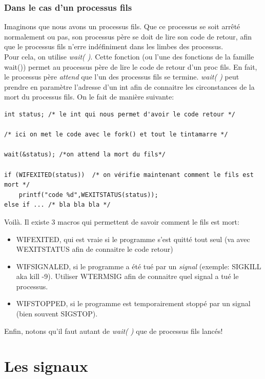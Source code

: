 \documentclass{report}
\begin{document}
\subsection{Dans le cas d'un processus fils}
Imaginons que nous avons un processus fils. Que ce processus se soit arrêté normalement ou pas, son processus père se doit de lire son code de retour, afin que le processus fils n'erre indéfiniment dans les limbes des processus.\\
Pour cela, on utilise \emph{wait( )}. Cette fonction (ou l'une des fonctions de la famille wait()) permet au processus père de lire le code de retour d'un proc fils. En fait, le processus père \emph{attend} que l'un des processus fils se termine. \emph{wait( )} peut prendre en paramètre l'adresse d'un int afin de connaitre les circonstances de la mort du processus fils. On le fait de manière suivante:
\begin{lstlisting}
int status; /* le int qui nous permet d'avoir le code retour */

/* ici on met le code avec le fork() et tout le tintamarre */

wait(&status); /*on attend la mort du fils*/

if (WIFEXITED(status))	/* on vérifie maintenant comment le fils est mort */
	printf("code %d",WEXITSTATUS(status));
else if ... /* bla bla bla */

\end{lstlisting}
Voilà. Il existe 3 macros qui permettent de savoir comment le fils est mort:
\begin{itemize}
\item \textsc{WIFEXITED}, qui est vraie si le programme s'est quitté tout seul (va avec \textsc{WEXITSTATUS} afin de connaitre le code retour)
\item \textsc{WIFSIGNALED}, si le programme a été tué par un \emph{signal} (exemple: SIGKILL aka kill -9). Utiliser \textsc{WTERMSIG} afin de connaitre quel signal a tué le processus.
\item \textsc{WIFSTOPPED}, si le programme est temporairement stoppé par un signal (bien souvent SIGSTOP).
\end{itemize}
Enfin, notons qu'il faut autant de \emph{wait( )} que de processus fils lancés!




\chapter{Les signaux}
\end{document}
